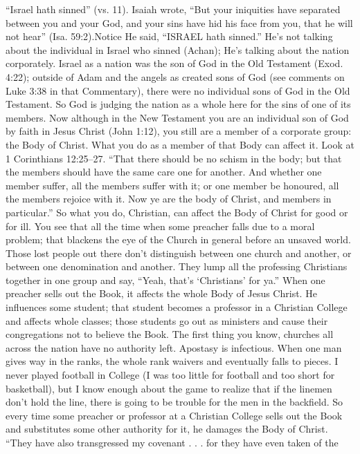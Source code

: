 {{“Israel hath sinned” (vs. 11). Isaiah wrote,
“But your iniquities have separated between
you and your God, and your sins have hid his
face from you, that he will not hear” (Isa.
59:2).Notice He said, “ISRAEL hath sinned.”
He’s not talking about the individual in Israel
who sinned (Achan); He’s talking about the
nation corporately. Israel as a nation was the
son of God in the Old Testament (Exod. 4:22);
outside of Adam and the angels as created sons
of God (see comments on Luke 3:38 in that
Commentary), there were no individual sons of
God in the Old Testament. So God is judging
the nation as a whole here for the sins of one of
its members.
Now although in the New Testament you
are an individual son of God by faith in Jesus
Christ (John 1:12), you still are a member of a
corporate group: the Body of Christ. What you
do as a member of that Body can affect it. Look
at 1 Corinthians 12:25–27.
“That there should be no schism in the
body; but that the members should have the
same care one for another. And whether one
member suffer, all the members suffer with
it; or one member be honoured, all the
members rejoice with it. Now ye are the body
of Christ, and members in particular.”
So what you do, Christian, can affect the
Body of Christ for good or for ill. You see that
all the time when some preacher falls due to a
moral problem; that blackens the eye of the
Church in general before an unsaved world.
Those lost people out there don’t distinguish
between one church and another, or between
one denomination and another. They lump all
the professing Christians together in one group
and say, “Yeah, that’s ‘Christians’ for ya.”
When one preacher sells out the Book, it
affects the whole Body of Jesus Christ. He
influences some student; that student becomes a
professor in a Christian College and affects
whole classes; those students go out as ministers
and cause their congregations not to believe the
Book. The first thing you know, churches all
across the nation have no authority left.
Apostasy is infectious.
When one man gives way in the ranks, the
whole rank waivers and eventually falls to
pieces. I never played football in College (I was
too little for football and too short for
basketball), but I know enough about the game
to realize that if the linemen don’t hold the line,
there is going to be trouble for the men in the
backfield. So every time some preacher or
professor at a Christian College sells out the
Book and substitutes some other authority for
it, he damages the Body of Christ.
“They have also transgressed my
covenant . . . for they have even taken of the
}}
